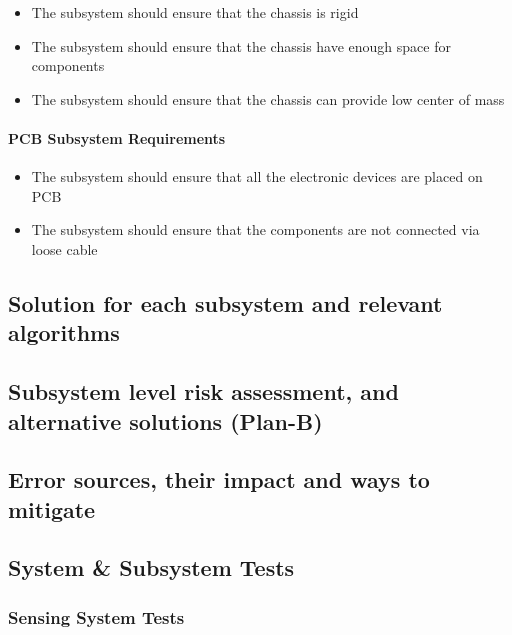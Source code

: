 \documentclass[a4paper,12pt]{article}
\begin{document}
			\begin{itemize}
			\item The subsystem should ensure that the chassis is rigid 
			\item The subsystem should ensure that the chassis have enough space for components
			\item The subsystem should ensure that the chassis can provide low center of mass 

		\end{itemize}
		
	\paragraph{PCB Subsystem Requirements}
	
		\begin{itemize}
			\item The subsystem should ensure that all the electronic devices are placed on PCB
			\item The subsystem should ensure that the components are not connected via loose cable 	
		\end{itemize}	



	



	\subsection{Solution for each subsystem and relevant algorithms}
	
	
	\subsection{Subsystem level risk assessment, and alternative solutions (Plan-B)}
	
	
	\subsection{ Error sources, their impact and ways to mitigate}
	
	
	\subsection{System \& Subsystem Tests }
	

	\subsubsection{Sensing System Tests}
	
\end{document}
